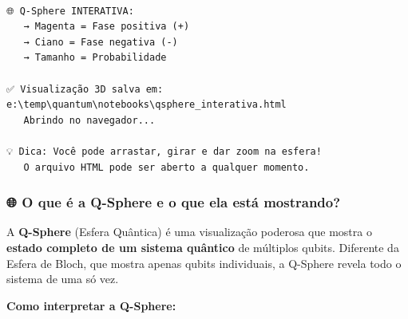 \documentclass[
  brazilian,
]{report}
\begin{document}
\begin{verbatim}

🌐 Q-Sphere INTERATIVA:
   → Magenta = Fase positiva (+)
   → Ciano = Fase negativa (-)
   → Tamanho = Probabilidade

✅ Visualização 3D salva em: e:\temp\quantum\notebooks\qsphere_interativa.html
   Abrindo no navegador...

💡 Dica: Você pode arrastar, girar e dar zoom na esfera!
   O arquivo HTML pode ser aberto a qualquer momento.
\end{verbatim}

\subsubsection{🌐 O que é a Q-Sphere e o que ela está
mostrando?}\label{o-que-uxe9-a-q-sphere-e-o-que-ela-estuxe1-mostrando}

A \textbf{Q-Sphere} (Esfera Quântica) é uma visualização poderosa que
mostra o \textbf{estado completo de um sistema quântico} de múltiplos
qubits. Diferente da Esfera de Bloch, que mostra apenas qubits
individuais, a Q-Sphere revela todo o sistema de uma só vez.

\textbf{Como interpretar a Q-Sphere:}
\end{document}
